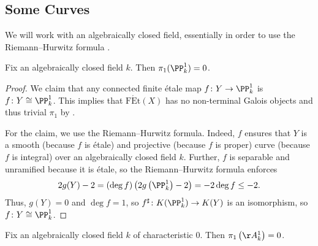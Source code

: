 \documentclass{amsart}
\begin{document}
\subsection{Some Curves}
We will work with an algebraically closed field, essentially in order to use the Riemann--Hurwitz formula \cite[Corollary~IV.2.4]{hartshorne}.
\begin{example} \label{ex:p1}
    Fix an algebraically closed field $k$. Then $\pi_1(\PP^1_k)=0$.
\end{example}
\begin{proof}
    We claim that any connected finite \'etale map $f\colon Y\to\PP^1_k$ is $f\colon Y\cong\PP^1_k$. This implies that $\mathrm{F\acute Et}(X)$ has no non-terminal Galois objects and thus trivial $\pi_1$ by .

    For the claim, we use the Riemann--Hurwitz formula. Indeed, $f$ ensures that $Y$ is a smooth (because $f$ is \'etale) and projective (because $f$ is proper) curve (because $f$ is integral) over an algebraically closed field $k$. Further, $f$ is separable and unramified because it is \'etale, so the Riemann--Hurwitz formula enforces
    \[2g(Y)-2=(\deg f)\left(2g\left(\PP^1_k\right)-2\right)=-2\deg f\le-2.\]
    Thus, $g(Y)=0$ and $\deg f=1$, so $f^\sharp\colon K(\PP^1_k)\to K(Y)$ is an isomorphism, so $f\colon Y\cong\PP^1_k$.
\end{proof}
\begin{example} \label{ex:a1}
    Fix an algebraically closed field $k$ of characteristic $0$. Then $\pi_1\left(\AA^1_k\right)=0$.
\end{example}
\end{document}
